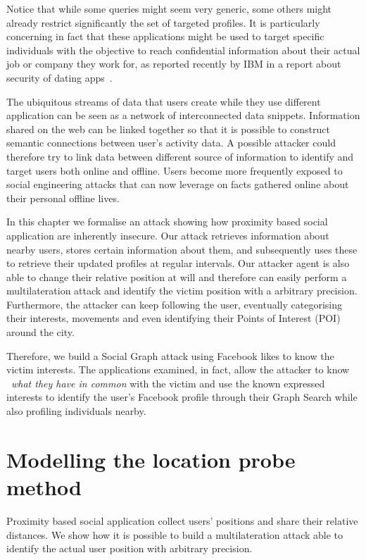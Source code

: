 Notice that while some queries might seem very generic, some others might already restrict significantly the set of targeted profiles. It is particularly concerning in fact that these applications might be used to target specific individuals with the objective to reach confidential information about their actual job or company they work for, as reported recently by IBM in a report about security of dating apps~\cite{ibm2015report}.

The ubiquitous streams of data that users create while they use different application can be seen as a network of interconnected data snippets. Information shared on the web can be linked together so that it is possible to construct semantic connections between user's activity data. A possible attacker could therefore try to link data between different source of information to identify and target users both online and offline. Users become more frequently exposed to social engineering attacks that can now leverage on facts gathered online about their personal offline lives.

In this chapter we formalise an attack showing how proximity based social application are inherently insecure. Our attack retrieves information about nearby users, stores certain information about them, and subsequently uses these to retrieve their updated profiles at regular intervals. Our attacker agent is also able to change their relative position at will and therefore can easily perform a multilateration attack and identify the victim position with a arbitrary precision. Furthermore, the attacker can keep following the user, eventually categorising their interests, movements and even identifying their Points of Interest (POI) around the city.

Therefore, we build a Social Graph attack using Facebook likes to know the victim interests. The applications examined, in fact, allow the attacker to know ~\emph{what they have in common} with the victim and use the known expressed interests to identify the user's Facebook profile through their Graph Search while also profiling individuals nearby.

\section{Modelling the location probe method}
\label{sec:loc-probe}
\noindent
Proximity based social application collect users' positions and share their relative distances. We show how it is possible to build a multilateration attack able to identify the actual user position with arbitrary precision.

